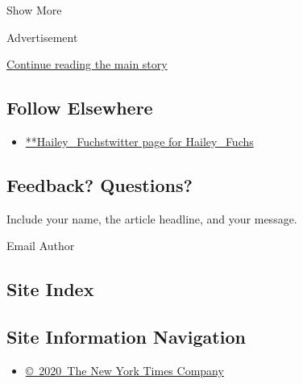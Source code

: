 Show More

Advertisement

\protect\hyperlink{after-mid2}{Continue reading the main story}

\hypertarget{follow-elsewhere}{%
\subsection{Follow Elsewhere}\label{follow-elsewhere}}

\begin{itemize}
\tightlist
\item
  \href{https://twitter.com/Hailey_Fuchs}{**Hailey\_Fuchstwitter page
  for Hailey\_Fuchs}
\end{itemize}

\hypertarget{feedback-questions}{%
\subsection{Feedback? Questions?}\label{feedback-questions}}

Include your name, the article headline, and your message.

Email Author

\hypertarget{site-index}{%
\subsection{Site Index}\label{site-index}}

\hypertarget{site-information-navigation}{%
\subsection{Site Information
Navigation}\label{site-information-navigation}}

\begin{itemize}
\tightlist
\item
  \href{https://help.nytimes.com/hc/en-us/articles/115014792127-Copyright-notice}{©~2020~The
  New York Times Company}
\end{itemize}

